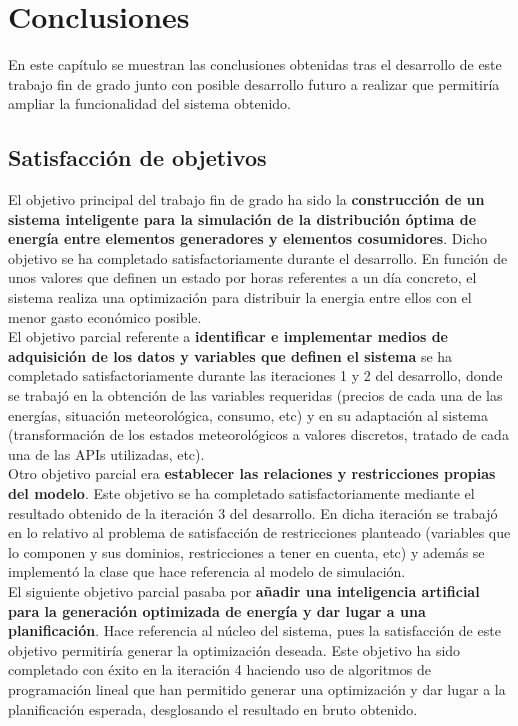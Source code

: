 \chapter{Conclusiones}
\label{cap:Conclusiones}
En este capítulo se muestran las conclusiones obtenidas tras el desarrollo de este trabajo fin de grado junto con posible desarrollo futuro a realizar que permitiría ampliar la funcionalidad del sistema obtenido.\\
\section{Satisfacción de objetivos}
El objetivo principal del trabajo fin de grado ha sido la \textbf{construcción de un sistema inteligente para la simulación de la distribución óptima de energía entre elementos generadores y elementos cosumidores}. Dicho objetivo se ha completado satisfactoriamente durante el desarrollo. En función de unos valores que definen un estado por horas referentes a un día concreto, el sistema realiza una optimización para distribuir la energia entre ellos con el menor gasto económico posible.\\

El objetivo parcial referente a \textbf{identificar e implementar medios de adquisición de los datos y variables que definen el sistema} se ha completado satisfactoriamente durante las iteraciones 1 y 2 del desarrollo, donde se trabajó en la obtención de las variables requeridas (precios de cada una de las energías, situación meteorológica, consumo, etc) y en su adaptación al sistema (transformación de los estados meteorológicos a valores discretos, tratado de cada una de las APIs utilizadas, etc).\\

Otro objetivo parcial era \textbf{establecer las relaciones y restricciones propias del modelo}. Este objetivo se ha completado satisfactoriamente mediante el resultado obtenido de la iteración 3 del desarrollo. En dicha iteración se trabajó en lo relativo al problema de satisfacción de restricciones planteado (variables que lo componen y sus dominios, restricciones a tener en cuenta, etc) y además se implementó la clase que hace referencia al modelo de simulación.\\

El siguiente objetivo parcial pasaba por \textbf{añadir una inteligencia artificial para la generación optimizada de energía y dar lugar a una planificación}. Hace referencia al núcleo del sistema, pues la satisfacción de este objetivo permitiría generar la optimización deseada. Este objetivo ha sido completado con éxito en la iteración 4 haciendo uso de algoritmos de programación lineal que han permitido generar una optimización y dar lugar a la planificación esperada, desglosando el resultado en bruto obtenido.\\


